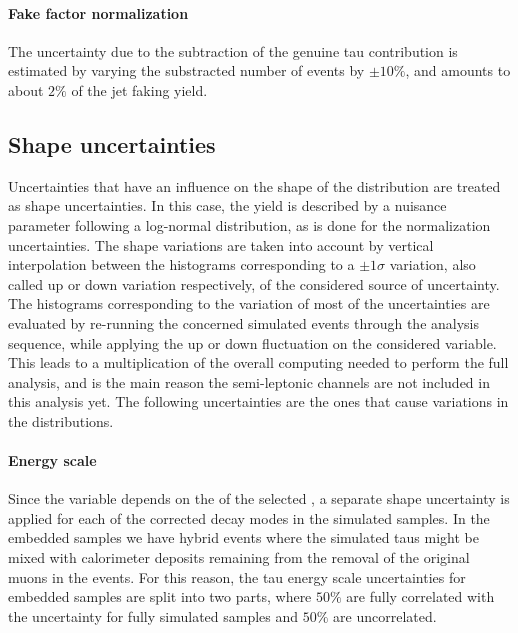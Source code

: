 \paragraph{Fake factor normalization} The uncertainty due to the subtraction of the genuine tau contribution is estimated by varying the substracted number of events by $\pm 10\%$, and amounts to about $2\%$ of the jet faking \tauh yield. %


\subsection{Shape uncertainties}

Uncertainties that have an influence on the shape of the \mttot distribution are treated as shape uncertainties. In this case, the yield is described by a nuisance parameter following a log-normal distribution, as is done for the normalization uncertainties. The shape variations are taken into account by vertical interpolation between the \mttot histograms corresponding to a $\pm 1 \sigma$ variation, also called up or down variation respectively, of the considered source of uncertainty. The histograms corresponding to the variation of most of the uncertainties are evaluated by re-running the concerned simulated events through the analysis sequence, while applying the up or down fluctuation on the considered variable. This leads to a multiplication of the overall computing needed to perform the full analysis, and is the main reason the semi-leptonic channels are not included in this analysis yet. The following uncertainties are the ones that cause variations in the \mttot distributions.

\paragraph{\tauh Energy scale} Since the \mttot variable depends on the \pt of the selected \tauh, a separate shape uncertainty is applied for each of the corrected decay modes in the simulated samples. In the embedded samples we have hybrid events where the simulated taus might be mixed with calorimeter deposits remaining from the removal of the original muons in the events. For this reason, the tau energy scale uncertainties for embedded samples are split into two parts, where $50\%$ are fully correlated with the uncertainty for fully simulated samples and $50\%$ are uncorrelated.


